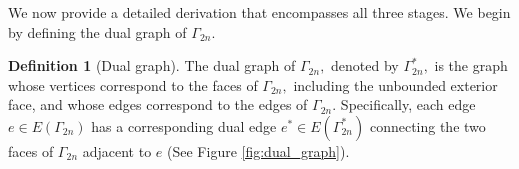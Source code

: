 \documentclass{amsart}
\theoremstyle{definition}
\newtheorem{defn}{Definition}
\newcommand{\saugat}[1]{\marginpar{\tiny \color{blue} Saugat: #1}}
\newcommand{\longnguyen}[1]
{\marginpar{\tiny \color{purple} Long: #1}}
\newcommand{\red}[1]{\textcolor{red}{#1}}
\begin{document}



We now provide a detailed derivation that encompasses all three stages. We begin by defining the dual graph of $\Gamma_{2n}.$


\begin{defn}[Dual graph]\label{defn:dualgraph}
    The dual graph of $\Gamma_{2n},$ denoted by $\Gamma_{2n}^{*},$ is the graph whose vertices correspond to the faces of 
    $\Gamma_{2n},$ including the unbounded exterior face, and whose edges correspond to the edges of $\Gamma_{2n}.$ Specifically, each edge $e \in E(\Gamma_{2n})$ has a corresponding dual edge $e^* \in E(\Gamma_{2n}^{*})$ connecting the two faces of $\Gamma_{2n}$ adjacent to $e$ (See Figure \ref{fig:dual_graph}).
\end{defn}

\end{document}
